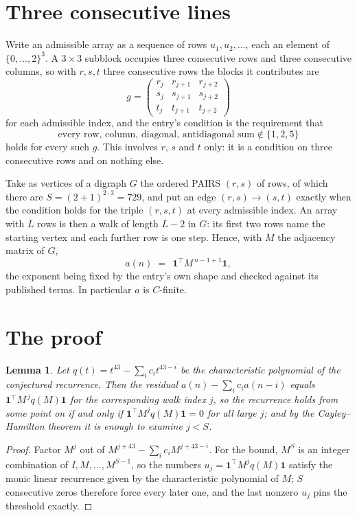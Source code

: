 \documentclass[11pt,a4paper]{article}
\theoremstyle{plain}
\newtheorem{lemma}[theorem]{Lemma}
\theoremstyle{definition}
\begin{document}
\section{Three consecutive lines}

Write an admissible array as a sequence of rows $u_1,u_2,\dots$, each an element of
$\{0,\dots,2\}^{3}$. A $3\times3$ subblock occupies three consecutive rows and
three consecutive columns, so with $r,s,t$ three consecutive rows the blocks it
contributes are
\[
g=\begin{pmatrix}r_j&r_{j+1}&r_{j+2}\\ s_j&s_{j+1}&s_{j+2}\\ t_j&t_{j+1}&t_{j+2}\end{pmatrix}
\]
for each admissible index, and the entry's condition is the requirement that
\[
\text{every row, column, diagonal, antidiagonal sum} \notin \{1,2,5\}
\]
holds for every such $g$. This involves $r$, $s$ and $t$ only: it is a condition on
three consecutive rows and on nothing else.

Take as vertices of a digraph $G$ the ordered PAIRS $(r,s)$ of rows, of which there are
$S=(2+1)^{2\cdot3}=729$, and put an edge $(r,s)\to(s,t)$ exactly when the condition
holds for the triple $(r,s,t)$ at every admissible index. An array with $L$ rows is then a
walk of length $L-2$ in $G$: its first two rows name the starting vertex and each further
row is one step. Hence, with $M$ the adjacency matrix of $G$,
\[
a(n)\;=\;\,\mathbf{1}^{\!\top}M^{\,n-1+1}\mathbf{1},
\]
the exponent being fixed by the entry's own shape and checked against its published terms.
In particular $a$ is $C$-finite.

\section{The proof}

\begin{lemma}\label{lem:crit}
Let $q(t)=t^{43}-\sum_i c_it^{43-i}$ be the characteristic polynomial of the
conjectured recurrence. Then the residual $a(n)-\sum_ic_ia(n-i)$ equals
$\mathbf{1}^{\!\top}M^{\,j}q(M)\mathbf{1}$ for the corresponding walk index
$j$, so the recurrence holds from some point on if and only if
$\mathbf{1}^{\!\top}M^{j}q(M)\mathbf{1}=0$ for all large $j$; and by the
Cayley--Hamilton theorem it is enough to examine $j<S$.
\end{lemma}

\begin{proof}
Factor $M^{j}$ out of $M^{j+43}-\sum_ic_iM^{j+43-i}$. For the bound, $M^{S}$
is an integer combination of $I,M,\dots,M^{S-1}$, so the numbers
$u_j=\mathbf{1}^{\!\top}M^{j}q(M)\mathbf{1}$ satisfy the monic linear recurrence given by
the characteristic polynomial of $M$; $S$ consecutive zeros therefore force every later one,
and the last nonzero $u_j$ pins the threshold exactly.
\end{proof}
\end{document}
